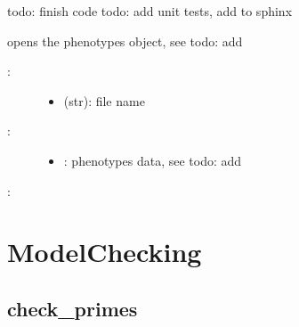 \documentclass[letterpaper,10pt,english]{sphinxmanual}
\begin{document}
\begin{fulllineitems}
\label{\detokenize{Phenotypes:PyBoolNet.Phenotypes.open_json}}
todo: finish code
todo: add unit tests, add to sphinx

opens the phenotypes object, see todo: add 
\begin{description}
\item[{:}] \leavevmode\begin{itemize}
\item {} 
 (str): file name

\end{itemize}

\item[{:}] \leavevmode\begin{itemize}
\item {} 
: phenotypes data, see todo: add 

\end{itemize}

\end{description}

:

\begin{sphinxVerbatim}[commandchars=\\\{\}]
  
\end{sphinxVerbatim}

\end{fulllineitems}



\section{ModelChecking}
\label{\detokenize{ModelChecking::doc}}\label{\detokenize{ModelChecking:modelchecking}}\label{\detokenize{ModelChecking:id1}}

\subsection{check\_primes}
\label{\detokenize{ModelChecking:id2}}\label{\detokenize{ModelChecking:check-primes}}
\end{document}
